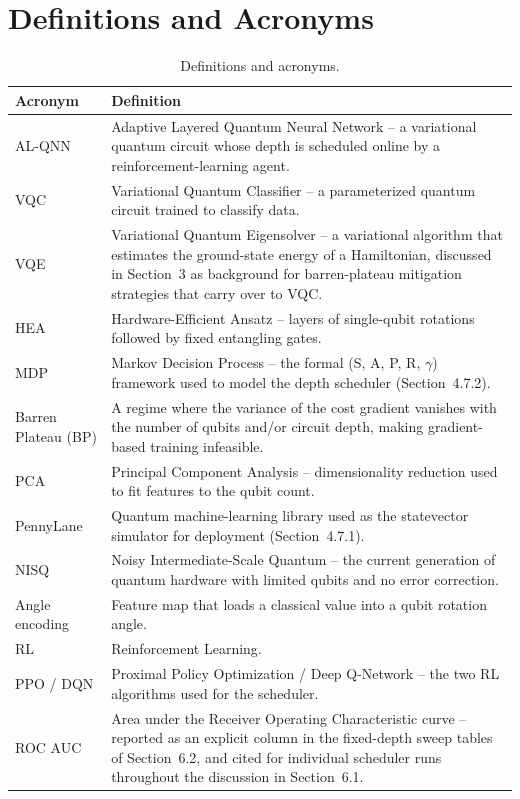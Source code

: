 \documentclass[11pt,fleqn]{article}
\begin{document}
\section*{Definitions and Acronyms}
\begin{table}[htbp]
\centering
\caption{Definitions and acronyms.}
\label{tab:acronyms}
\begin{tabular}{|p{3cm}|p{11cm}|}
\hline
\textbf{Acronym} & \textbf{Definition} \\
\hline
AL-QNN & Adaptive Layered Quantum Neural Network -- a variational quantum circuit whose depth is scheduled online by a reinforcement-learning agent. \\
\hline
VQC & Variational Quantum Classifier -- a parameterized quantum circuit trained to classify data. \\
\hline
VQE & Variational Quantum Eigensolver -- a variational algorithm that estimates the ground-state energy of a Hamiltonian, discussed in Section~3 as background for barren-plateau mitigation strategies that carry over to VQC. \\
\hline
HEA & Hardware-Efficient Ansatz -- layers of single-qubit rotations followed by fixed entangling gates. \\
\hline
MDP & Markov Decision Process -- the formal (S, A, P, R, $\gamma$) framework used to model the depth scheduler (Section~4.7.2). \\
\hline
Barren Plateau (BP) & A regime where the variance of the cost gradient vanishes with the number of qubits and/or circuit depth, making gradient-based training infeasible. \\
\hline
PCA & Principal Component Analysis -- dimensionality reduction used to fit features to the qubit count. \\
\hline
PennyLane & Quantum machine-learning library used as the statevector simulator for deployment (Section~4.7.1). \\
\hline
NISQ & Noisy Intermediate-Scale Quantum -- the current generation of quantum hardware with limited qubits and no error correction. \\
\hline
Angle encoding & Feature map that loads a classical value into a qubit rotation angle. \\
\hline
RL & Reinforcement Learning. \\
\hline
PPO / DQN & Proximal Policy Optimization / Deep Q-Network -- the two RL algorithms used for the scheduler. \\
\hline
ROC AUC & Area under the Receiver Operating Characteristic curve -- reported as an explicit column in the fixed-depth sweep tables of Section~6.2, and cited for individual scheduler runs throughout the discussion in Section~6.1. \\
\hline
\end{tabular}
\end{table}
\end{document}

